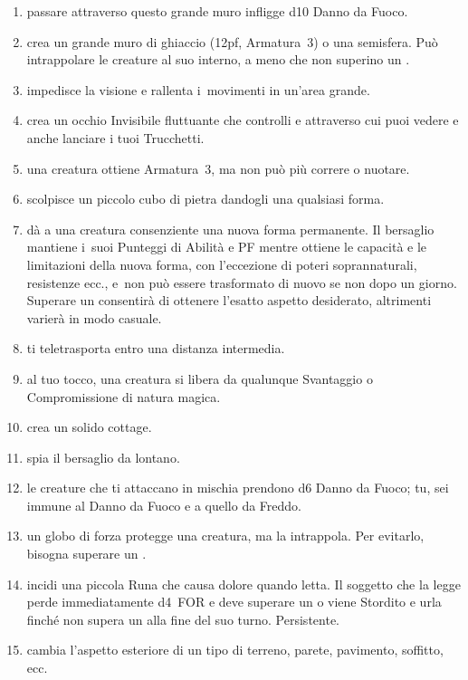\documentclass[itdr]{subfiles}
\begin{document}
\begin{enumerate}
	\item {} passare attraverso questo grande muro infligge d10 Danno da Fuoco.
	\item {} crea un grande muro di ghiaccio (12pf, Armatura~3) o una semisfera. Può intrappolare le creature al suo interno, a meno che non superino un .
	\item {} impedisce la visione e rallenta i~movimenti in un'area grande.
	\item {} crea un occhio Invisibile fluttuante che controlli e attraverso cui puoi vedere e anche lanciare i tuoi Trucchetti.
	\item {} una creatura ottiene Armatura~3, ma non può più correre o nuotare.
	\item {} scolpisce un piccolo cubo di pietra dandogli una qualsiasi forma.
	\item {} dà a una creatura consenziente una nuova forma permanente. Il bersaglio mantiene i~suoi Punteggi di Abilità e PF mentre ottiene le capacità e le limitazioni della nuova forma, con l'eccezione di poteri soprannaturali, resistenze ecc., e~non può essere trasformato di nuovo se non dopo un giorno. Superare un  consentirà di ottenere l'esatto aspetto desiderato, altrimenti varierà in modo casuale.
	\item {} ti teletrasporta entro una distanza intermedia.
	\item {} al tuo tocco, una creatura si libera da qualunque Svantaggio o Compromissione di natura magica.
	\item {} crea un solido cottage.
	\item {} spia il bersaglio da lontano.
	\item {} le creature che ti attaccano in mischia prendono d6 Danno da Fuoco; tu, sei immune al Danno da Fuoco e a quello da Freddo.
	\item {} un globo di forza protegge una creatura, ma la intrappola. Per evitarlo, bisogna superare un .
	\item {} incidi una piccola Runa che causa dolore quando letta. Il soggetto che la legge perde immediatamente d4~FOR e deve superare un  o viene Stordito e urla finché non supera un  alla fine del suo turno. Persistente.
	\item {} cambia l'aspetto esteriore di un tipo di terreno, parete, pavimento, soffitto, ecc.

\end{enumerate}
\end{document}
